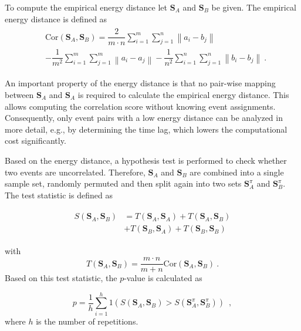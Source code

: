 \documentclass[conference]{IEEEtran}
\theoremstyle{examplestyle}
\begin{document}
To compute the empirical energy distance let \(\pmb{S}_A\) and \(\pmb{S}_B\) be given. The empirical energy distance is defined as
\begin{align}
\begin{split}
	& \text{Cor}(\pmb{S}_A, \pmb{S}_B) = \dfrac{2}{m \cdot n} \sum_{i = 1}^m \sum_{j = 1}^n \left\| a_i - b_j \right\| \\
	& - \dfrac{1}{m^2} \sum_{i = 1}^m \sum_{j = 1}^m \left\| a_i - a_j \right\| - \dfrac{1}{n^2} \sum_{i = 1}^n \sum_{j = 1}^n \left\| b_i - b_j \right\| ~.
\end{split}
\end{align}

An important property of the energy distance is that no pair-wise mapping between \(\pmb{S}_A\) and \(\pmb{S}_A\) is required to calculate the empirical energy distance. This allows computing the correlation score without knowing event assignments. 
Consequently, only event pairs with a low energy distance can be analyzed in more detail, e.g., by determining the time lag, which lowers the computational cost significantly.

Based on the energy distance, a hypothesis test is performed to check whether two events are uncorrelated. Therefore, \(\pmb{S}_A\) and \(\pmb{S}_B\) are combined into a single sample set, randomly permuted and then split again into two sets \(\pmb{S}_A^\pi\) and \(\pmb{S}_B^\pi\).
The test statistic is defined as

\begin{align}
\begin{split}
	S(\pmb{S}_A, \pmb{S}_B) &= T(\pmb{S}_A, \pmb{S}_A) +  T(\pmb{S}_A, \pmb{S}_B) \\
							& + T(\pmb{S}_B, \pmb{S}_A) + T(\pmb{S}_B, \pmb{S}_B)
\end{split}
\end{align}

with
\begin{equation*}
	T(\pmb{S}_A, \pmb{S}_B) = \dfrac{m \cdot n}{m + n} \text{Cor}(\pmb{S}_A, \pmb{S}_B) ~.
\end{equation*}
Based on this test statistic, the \(p\)-value is calculated as

\begin{equation}
	p = \dfrac{1}{h} \sum_{i = 1}^h 1 \left( S(\pmb{S}_A, \pmb{S}_B) > S(\pmb{S}_A^\pi , \pmb{S}_B^\pi) \right) \enspace, 
\end{equation}
where \(h\) is the number of repetitions.
\end{document}
